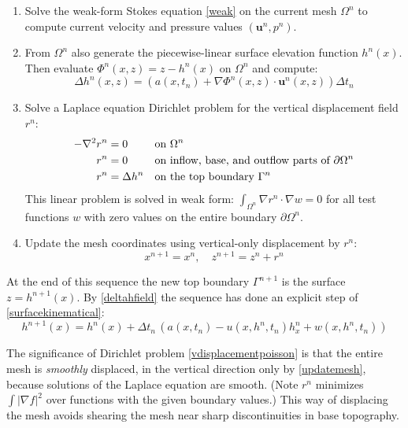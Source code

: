 \documentclass[letterpaper,final,12pt,reqno]{amsart}
\newcommand{\grad}{\nabla}
\newcommand{\bu}{\mathbf{u}}
\begin{document}
\medskip
\renewcommand{\labelenumi}{\emph{\arabic{enumi}.}}
\begin{enumerate}
\item Solve the weak-form Stokes equation \eqref{weak} on the current mesh $\Omega^n$ to compute current velocity and pressure values $(\bu^n,p^n)$.
\item From $\Omega^n$ also generate the piecewise-linear surface elevation function $h^n(x)$.  Then evaluate $\Phi^n(x,z) = z - h^n(x)$ on $\Omega^n$ and compute:
\begin{equation}
\Delta h^n(x,z) =  \left(a(x,t_n) + \grad \Phi^n(x,z)\cdot \bu^n(x,z)\right)\Delta t_n \label{deltahfield}
\end{equation}
\item Solve a Laplace equation Dirichlet problem for the vertical displacement field $r^n$:
\begin{align}
- \grad^2 r^n &= 0 & &\text{on } \Omega^n \label{vdisplacementpoisson} \\
          r^n &= 0 & &\text{on inflow, base, and outflow parts of } \partial \Omega^n \notag \\
          r^n &= \Delta h^n & &\text{on the top boundary } \Gamma^n \notag
\end{align}
This linear problem is solved in weak form: $\int_{\Omega^n} \grad r^n\cdot \grad w = 0$ for all test functions $w$ with zero values on the entire boundary $\partial \Omega^n$.
\item Update the mesh coordinates using vertical-only displacement by $r^n$:
\begin{equation}
  x^{n+1} = x^n, \quad z^{n+1} = z^n + r^n \label{updatemesh}
\end{equation}
\end{enumerate}

\medskip
At the end of this sequence the new top boundary $\Gamma^{n+1}$ is the surface $z=h^{n+1}(x)$.  By \eqref{deltahfield} the sequence has done an explicit step of \eqref{surfacekinematical}:
    $$h^{n+1}(x) = h^n(x) + \Delta t_n\,\left(a(x,t_n) - u(x,h^n,t_n) h_x^n + w(x,h^n,t_n)\right)$$

The significance of Dirichlet problem \eqref{vdisplacementpoisson} is that the entire mesh is \emph{smoothly} displaced, in the vertical direction only by \eqref{updatemesh}, because solutions of the Laplace equation are smooth.  (Note $r^n$ minimizes $\int |\grad f|^2$ over functions with the given boundary values.)  This way of displacing the mesh avoids shearing the mesh near sharp discontinuities in base topography.
\end{document}
